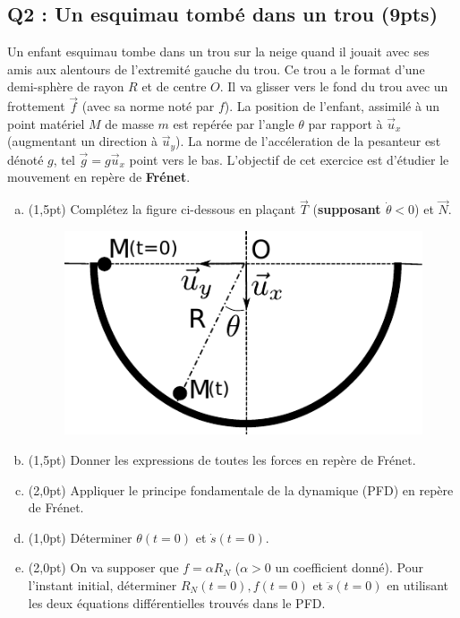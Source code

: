 \documentclass[french,10pt,twocolumn]{article}
\begin{document}
	\subsection*{Q2 : Un esquimau tombé dans un trou (9pts)} 
	Un enfant esquimau tombe dans un trou sur la neige quand il jouait avec ses amis aux alentours de l'extremité gauche du trou. Ce trou a le format d'une demi-sphère de rayon $R$ et de centre $O$. Il va glisser vers le fond du trou avec un frottement $\vec{f}$ (avec sa norme noté par $f$). La position de l'enfant, assimilé à un point matériel $M$ de masse $m$ est repérée par l’angle $\theta$ par rapport à $\vec{u}_x$ (augmentant un direction à $\vec{u}_y$). La norme de l'accéleration de la pesanteur est dénoté $g$, tel $\vec{g} = g\vec{u}_x$ point vers le bas. L'objectif de cet exercice est d'étudier le mouvement en repère de \textbf{Frénet}. 
	\begin{enumerate}[a)]
		\item(1,5pt) Complétez la figure ci-dessous en plaçant $\vec{T}$ (\textbf{supposant $\dot{\theta}<0$}) et $\vec{N}$.
		\begin{figure}[h!]
			\centering
			\includegraphics[width=0.5\linewidth]{trou}
		\end{figure}
		\item(1,5pt) Donner les expressions de toutes les forces en repère de Frénet.
		\item(2,0pt) Appliquer le principe fondamentale de la dynamique (PFD) en repère de Frénet.
		\item(1,0pt) Déterminer $\theta(t=0)$ et $\dot{s}(t=0)$.
		\item(2,0pt) On va supposer que $f = \alpha R_N$ ($\alpha >0$ un coefficient donné). Pour l'instant initial, déterminer $R_N(t=0), f(t=0)$ et $\ddot{s}(t=0)$ en utilisant les deux équations différentielles trouvés dans le PFD.
	\end{enumerate}
\end{document}
